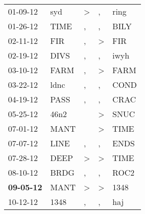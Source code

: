 \begin{supertabular}{p{0.07\textwidth}p{0.06\textwidth}p{0.02\textwidth}p{0.02\textwidth}p{0.06\textwidth}}
          01-09-12\textsuperscript{} &            syd\textsuperscript{} &     \textgreater &                , &           ring\textsuperscript{} \\
          01-26-12\textsuperscript{} &           TIME\textsuperscript{} &                , &                , &           BILY\textsuperscript{} \\
          02-11-12\textsuperscript{} &            FIR\textsuperscript{} &                , &     \textgreater &            FIR\textsuperscript{} \\
          02-19-12\textsuperscript{} &           DIVS\textsuperscript{} &                , &                , &           iwyh\textsuperscript{} \\
          03-10-12\textsuperscript{} &           FARM\textsuperscript{} &                , &     \textgreater &           FARM\textsuperscript{} \\
          03-22-12\textsuperscript{} &           ldnc\textsuperscript{} &                , &                , &           COND\textsuperscript{} \\
          04-19-12\textsuperscript{} &           PASS\textsuperscript{} &                , &                , &           CRAC\textsuperscript{} \\
          05-25-12\textsuperscript{} &           46n2\textsuperscript{} &                  &     \textgreater &           SNUC\textsuperscript{} \\
          07-01-12\textsuperscript{} &           MANT\textsuperscript{} &                  &     \textgreater &           TIME\textsuperscript{} \\
          07-07-12\textsuperscript{} &           LINE\textsuperscript{} &                , &                , &           ENDS\textsuperscript{} \\
          07-28-12\textsuperscript{} &           DEEP\textsuperscript{} &     \textgreater &     \textgreater &           TIME\textsuperscript{} \\
          08-10-12\textsuperscript{} &           BRDG\textsuperscript{} &                , &                , &           ROC2\textsuperscript{} \\
 \textbf{09-05-12\textsuperscript{}} &           MANT\textsuperscript{} &     \textgreater &     \textgreater &           1348\textsuperscript{} \\
          10-12-12\textsuperscript{} &           1348\textsuperscript{} &                , &                , &            haj\textsuperscript{} \\

\end{supertabular}
